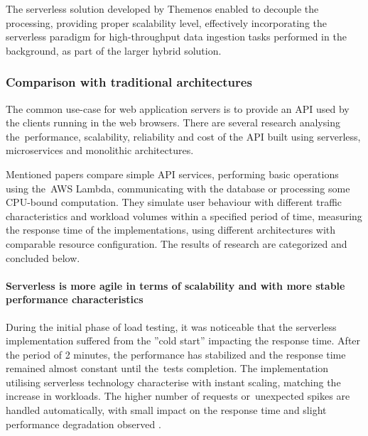 The serverless solution developed by Themenos enabled to decouple the processing, providing proper scalability level, effectively incorporating the serverless paradigm for high-throughput data ingestion tasks performed in the background, as part of the larger hybrid solution.

\subsubsection{Comparison with traditional architectures} \label{chapter:comparison-with-traditional-architectures}

The common use-case for web application servers is to provide an API used by the clients running in the web browsers.
There are several research \cite{ServerlessComputingAnInvestigationOfDeploymentEnvironmentsForWebAPIs} \cite{MicroservicesvsServerlessAPerformanceComparisonOnCloudNativeWebApplication} analysing the~performance, scalability, reliability and cost of the API built using serverless, microservices and monolithic architectures.

Mentioned papers compare simple API services, performing basic operations using the~AWS Lambda, communicating with the database or processing some CPU-bound computation.
They simulate user behaviour with different traffic characteristics and workload volumes within a specified period of time, measuring the response time of the implementations, using different architectures with comparable resource configuration. The results of research are categorized and concluded below.

\paragraph{Serverless is more agile in terms of scalability and with more stable performance characteristics}

During the initial phase of load testing, it was noticeable that the serverless implementation suffered from the ''cold start'' impacting the response time.
After the period of 2 minutes, the performance has stabilized and the response time remained almost constant until the~tests completion.
The implementation utilising serverless technology characterise with instant scaling, matching the increase in workloads.
The higher number of requests or~unexpected spikes are handled automatically, with small impact on the response time and slight performance degradation observed \cite{ServerlessComputingAnInvestigationOfDeploymentEnvironmentsForWebAPIs}.

